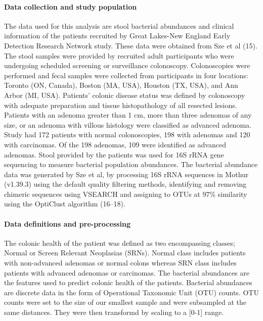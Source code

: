 \documentclass[11pt,]{article}
\let\oldparagraph\paragraph
\renewcommand{\paragraph}[1]{\oldparagraph{#1}\mbox{}}
\begin{document}
\paragraph{Data collection and study
population}\label{data-collection-and-study-population}

The data used for this analysis are stool bacterial abundances and
clinical information of the patients recruited by Great Lakes-New
England Early Detection Research Network study. These data were obtained
from Sze et al (15). The stool samples were provided by recruited adult
participants who were undergoing scheduled screening or surveillance
colonoscopy. Colonoscopies were performed and fecal samples were
collected from participants in four locations: Toronto (ON, Canada),
Boston (MA, USA), Houston (TX, USA), and Ann Arbor (MI, USA). Patients'
colonic disease status was defined by colonoscopy with adequate
preparation and tissue histopathology of all resected lesions. Patients
with an adenoma greater than 1 cm, more than three adenomas of any size,
or an adenoma with villous histology were classified as advanced
adenoma. Study had 172 patients with normal colonoscopies, 198 with
adenomas and 120 with carcinomas. Of the 198 adenomas, 109 were
identified as advanced adenomas. Stool provided by the patients was used
for 16S rRNA gene sequencing to measure bacterial population abundances.
The bacterial abundance data was generated by Sze et al, by processing
16S rRNA sequences in Mothur (v1.39.3) using the default quality
filtering methods, identifying and removing chimeric sequences using
VSEARCH and assigning to OTUs at 97\% similarity using the OptiClust
algorithm (16--18).

\paragraph{Data definitions and
pre-processing}\label{data-definitions-and-pre-processing}

The colonic health of the patient was defined as two encompassing
classes; Normal or Screen Relevant Neoplasias (SRNs). Normal class
includes patients with non-advanced adenomas or normal colons whereas
SRN class includes patients with advanced adenomas or carcinomas. The
bacterial abundances are the features used to predict colonic health of
the patients. Bacterial abundances are discrete data in the form of
Operational Taxonomic Unit (OTU) counts. OTU counts were set to the size
of our smallest sample and were subsampled at the same distances. They
were then transformd by scaling to a {[}0-1{]} range.
\end{document}
